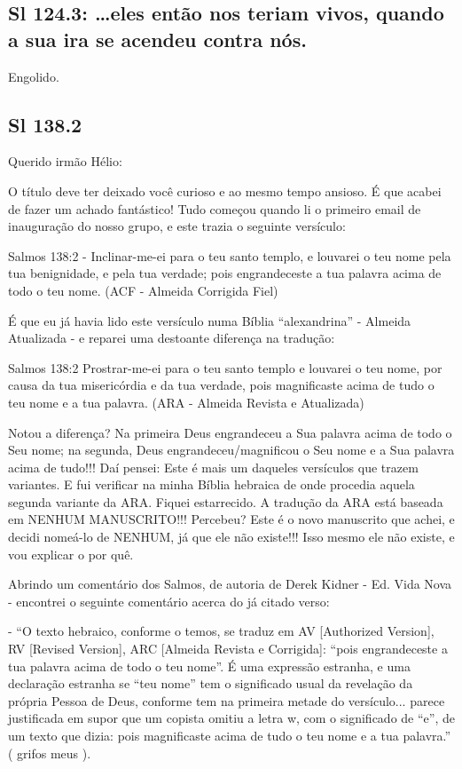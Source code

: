 \subsection{Sl 124.3: \ldots eles então nos teriam  vivos, quando a sua ira se acendeu contra nós.}
Engolido.

\subsection{Sl 138.2}

Querido irmão Hélio:

O título deve ter deixado você curioso e ao mesmo tempo ansioso. É que acabei de fazer um achado fantástico! Tudo começou quando li o primeiro email de inauguração do nosso grupo, e este trazia o seguinte versículo:

Salmos 138:2 - Inclinar-me-ei para o teu santo templo, e louvarei o teu nome pela tua benignidade, e pela tua verdade; pois engrandeceste a tua palavra acima de todo o teu nome. (ACF - Almeida Corrigida Fiel)

É que eu já havia lido este versículo numa Bíblia ``alexandrina'' - Almeida Atualizada - e reparei uma destoante diferença na tradução:

Salmos 138:2 Prostrar-me-ei para o teu santo templo e louvarei o teu nome, por causa da tua misericórdia e da tua verdade, pois magnificaste acima de tudo o teu nome e a tua palavra. (ARA - Almeida Revista e Atualizada)

Notou a diferença? Na primeira Deus engrandeceu a Sua palavra acima de todo o Seu nome; na segunda, Deus engrandeceu/magnificou o Seu nome e a Sua palavra acima de tudo!!! Daí pensei: Este é mais um daqueles versículos que trazem variantes. E fui verificar na minha Bíblia hebraica de onde procedia aquela segunda variante da ARA. Fiquei estarrecido. A tradução da ARA está baseada em NENHUM MANUSCRITO!!! Percebeu? Este é o novo manuscrito que achei, e decidi nomeá-lo de NENHUM, já que ele não existe!!! Isso mesmo ele não existe, e vou explicar o por quê.

Abrindo um comentário dos Salmos, de autoria de Derek Kidner - Ed. Vida Nova - encontrei o seguinte comentário acerca do já citado verso:

- ``O texto hebraico, conforme o temos, se traduz em AV [Authorized Version], RV [Revised Version], ARC [Almeida Revista e Corrigida]: ``pois engrandeceste a tua palavra acima de todo o teu nome''. É uma expressão estranha, e uma declaração estranha se ``teu nome'' tem o significado usual da revelação da própria Pessoa de Deus, conforme tem na primeira metade do versículo... parece justificada em supor que um copista omitiu a letra w, com o significado de ``e'', de um texto que dizia: pois magnificaste acima de tudo o teu nome e a tua palavra.'' ( grifos meus ).


